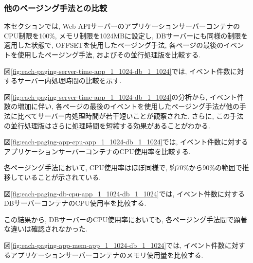 \documentclass[../../../../main]{subfiles}
\begin{document}
    \subsubsection{他のページング手法との比較}\label{subsubsec:result-each-paging-only-limit}

    本セクションでは, Web APIサーバーのアプリケーションサーバーコンテナのCPU制限を100\%, メモリ制限を1024MBに設定し, DBサーバーにも同様の制限を適用した状態で, OFFSETを使用したページング手法, 各ページの最後のイベントを使用したページング手法, およびその並行処理版を比較する.

    \label{subsubsubsec:result-each-paging-only-limit-server-time}

    図\ref{fig:each-paging-server-time-app_1_1024-db_1_1024}では, イベント件数に対するサーバー内処理時間の比較を示す.

    

    図\ref{fig:each-paging-server-time-app_1_1024-db_1_1024}の分析から, イベント件数の増加に伴い, 各ページの最後のイベントを使用したページング手法が他の手法に比べてサーバー内処理時間が若干短いことが観察された. さらに, この手法の並行処理版はさらに処理時間を短縮する効果があることがわかる.

    \label{subsubsubsec:result-each-paging-only-limit-cpu}

    図\ref{fig:each-paging-app-cpu-app_1_1024-db_1_1024}では, イベント件数に対するアプリケーションサーバーコンテナのCPU使用率を比較する.

    

    各ページング手法において, CPU使用率はほぼ同様で, 約70\%から90\%の範囲で推移していることが示されている.

    図\ref{fig:each-paging-db-cpu-app_1_1024-db_1_1024}では, イベント件数に対するDBサーバーコンテナのCPU使用率を比較する.

    

    この結果から, DBサーバーのCPU使用率においても, 各ページング手法間で顕著な違いは確認されなかった.

    \label{subsubsubsec:result-each-paging-only-limit-mem}

    図\ref{fig:each-paging-app-mem-app_1_1024-db_1_1024}では, イベント件数に対するアプリケーションサーバーコンテナのメモリ使用量を比較する.
\end{document}
